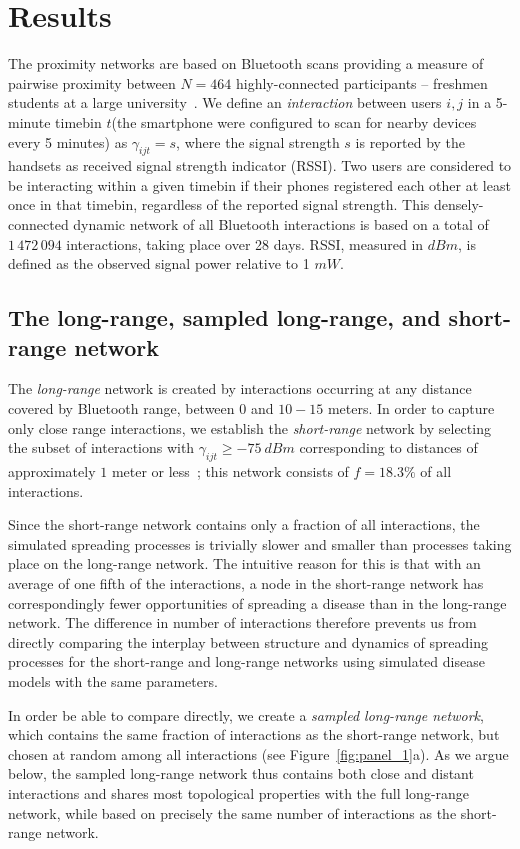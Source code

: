 \documentclass[fleqn,10pt]{wlscirep}
\begin{document}
\section*{Results}
The proximity networks are based on Bluetooth scans providing a measure of pairwise proximity between $N=464$ highly-connected participants -- freshmen students at a large university~\cite{10.1371/journal.pone.0095978}. 
We define an \textit{interaction} between users $i,j$ in a 5-minute timebin $t$(the smartphone were configured to scan for nearby devices every 5 minutes) as $\gamma_{ijt} = s$, where the signal strength $s$ is reported by the handsets as received signal strength indicator (RSSI).
Two users are considered to be interacting within a given timebin if their phones registered each other at least once in that timebin, regardless of the reported signal strength.
This densely-connected dynamic network of all Bluetooth interactions is based on a total of $1\,472\,094$ interactions, taking place over 28 days.
RSSI, measured in $dBm$, is defined as the observed signal power relative to 1 $mW$. 

\subsection*{The long-range, sampled long-range, and short-range network}
The \emph{long-range} network is created by interactions occurring at any distance covered by Bluetooth range, between $0$ and $10-15$ meters.
In order to capture only close range interactions, we establish the \emph{short-range} network by selecting the subset of interactions with $\gamma_{ijt} \geq -75\ dBm$ corresponding to distances of approximately $1$ meter or less~\cite{sekara2014strength}; this network consists of $f = 18.3\%$ of all interactions.

Since the short-range network contains only a fraction of all interactions, the simulated spreading processes is trivially slower and smaller than processes taking place on the long-range network.
The intuitive reason for this is that with an average of one fifth of the interactions, a node in the short-range network has correspondingly fewer opportunities of spreading a disease than in the long-range network.
The difference in number of interactions therefore prevents us from directly comparing the interplay between structure and dynamics of spreading processes for the short-range and long-range networks using simulated disease models with the same parameters.

In order be able to compare directly, we create a \emph{sampled long-range network}, which contains the same fraction of interactions as the short-range network, but chosen at random among all interactions (see Figure~\ref{fig:panel_1}a). 
As we argue below, the sampled long-range network thus contains both close and distant interactions and shares most topological properties with the full long-range network, while based on precisely the same number of interactions as the short-range network. 
\end{document}
